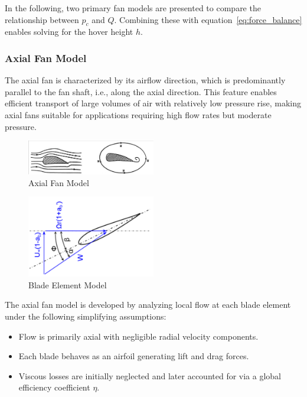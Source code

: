 In the following, two primary fan models are presented to compare the relationship between \( p_c \) and \( Q \). Combining these with equation~\eqref{eq:force_balance} enables solving for the hover height \( h \).


\subsubsection{Axial Fan Model}

The axial fan is characterized by its airflow direction, which is predominantly parallel to the fan shaft, i.e., along the axial direction. This feature enables efficient transport of large volumes of air with relatively low pressure rise, making axial fans suitable for applications requiring high flow rates but moderate pressure.


\begin{figure}[H]
  \centering
  \includegraphics[width=0.5\textwidth]{images/AxialFan.png}
  \caption{Axial Fan Model}
  \label{fig:Axial Fan Model}
\end{figure}

\begin{figure}[H]
  \centering
  \includegraphics[width=0.5\textwidth]{images/blade.png}
  \caption{Blade Element Model}
  \label{fig:Blade Element Model}
\end{figure}

The axial fan model is developed by analyzing local flow at each blade element under the following simplifying assumptions:
\begin{itemize}
    \item Flow is primarily axial with negligible radial velocity components.
    \item Each blade behaves as an airfoil generating lift and drag forces.
    \item Viscous losses are initially neglected and later accounted for via a global efficiency coefficient \( \eta \).
\end{itemize}

